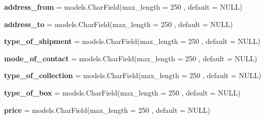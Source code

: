 \begin{DoxyCompactItemize}
\item 
\mbox{\label{classmessengerbot_1_1models_1_1order_a542b5b25ad9f273f894497e80478aabb}} 
{\bfseries address\+\_\+from} = models.\+Char\+Field(max\+\_\+length = 250 , default = \textquotesingle{}N\+U\+LL\textquotesingle{})
\item 
\mbox{\label{classmessengerbot_1_1models_1_1order_a1d2d8e7fe76723170227305bc1ba79c4}} 
{\bfseries address\+\_\+to} = models.\+Char\+Field(max\+\_\+length = 250 , default = \textquotesingle{}N\+U\+LL\textquotesingle{})
\item 
\mbox{\label{classmessengerbot_1_1models_1_1order_a6bd62a1f2ab59c8af74c1c8c088f5928}} 
{\bfseries type\+\_\+of\+\_\+shipment} = models.\+Char\+Field(max\+\_\+length = 250 , default = \textquotesingle{}N\+U\+LL\textquotesingle{})
\item 
\mbox{\label{classmessengerbot_1_1models_1_1order_a3f34d7a4ded6a7385f05026188db3cc1}} 
{\bfseries mode\+\_\+of\+\_\+contact} = models.\+Char\+Field(max\+\_\+length = 250 , default = \textquotesingle{}N\+U\+LL\textquotesingle{})
\item 
\mbox{\label{classmessengerbot_1_1models_1_1order_a0c4f500101d95c3ffd496d395ab424ed}} 
{\bfseries type\+\_\+of\+\_\+collection} = models.\+Char\+Field(max\+\_\+length = 250 , default = \textquotesingle{}N\+U\+LL\textquotesingle{})
\item 
\mbox{\label{classmessengerbot_1_1models_1_1order_a55da26eb9a52d6c13a48d27cd93a42ca}} 
{\bfseries type\+\_\+of\+\_\+box} = models.\+Char\+Field(max\+\_\+length = 250 , default = \textquotesingle{}N\+U\+LL\textquotesingle{})
\item 
\mbox{\label{classmessengerbot_1_1models_1_1order_a5567b200572ec342a76f30210f08628a}} 
{\bfseries price} = models.\+Char\+Field(max\+\_\+length = 250 , default = \textquotesingle{}N\+U\+LL\textquotesingle{})
\item 
\mbox{\label{classmessengerbot_1_1models_1_1order_ac3f038c29357b02865d2d6cd02994c8a}} 

\end{DoxyCompactItemize}
